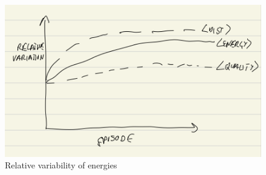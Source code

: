 \begin{figure}[ht]
	\centering
	\includegraphics[width=0.8\linewidth]{5_ewsn_relative_variation}
	\captionsetup{labelfont=bf,singlelinecheck=on}
	\caption{Relative variability of energies}
	\label{fig:5_ewsn_relative_variation}
\end{figure}
